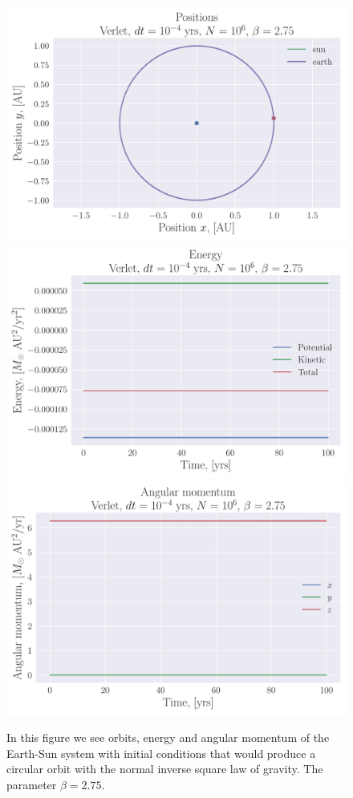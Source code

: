 \documentclass[reprint, english,notitlepage,nofootinbib]{revtex4-1}  %
\begin{document}
\begin{figure}[h]
	\centering
	\includegraphics[width=\linewidth]{../output/earth_sun_circ-verlet-4-6-2_75.pdf}
  \includegraphics[width=\linewidth]{../output/earth_sun_circ-verlet-4-6-2_75_energy.pdf}
  \includegraphics[width=\linewidth]{../output/earth_sun_circ-verlet-4-6-2_75_ang_mom.pdf}
	\caption{In this figure we see orbits, energy and angular momentum of the Earth-Sun system with initial conditions that would produce a circular orbit with the normal inverse square law of gravity. The parameter $\beta = 2.75$.}
	\label{fig:earth_sun_circ_beta=2_75}
\end{figure}
\end{document}
